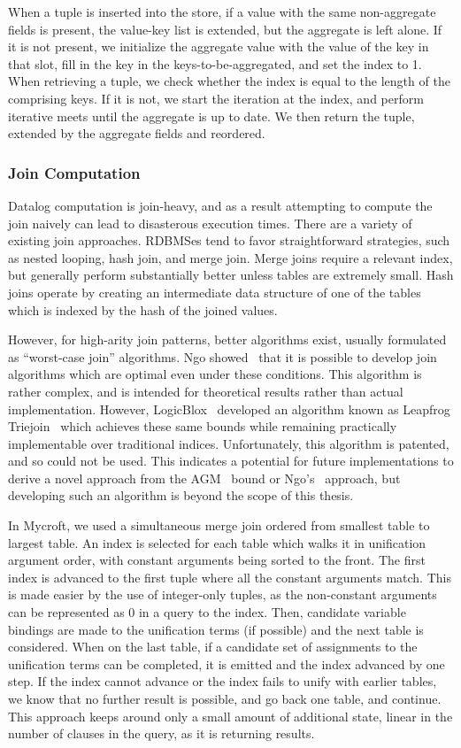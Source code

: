 When a tuple is inserted into the store, if a value with the same non-aggregate fields is present, the value-key list is extended, but the aggregate is left alone.
If it is not present, we initialize the aggregate value with the value of the key in that slot, fill in the key in the keys-to-be-aggregated, and set the index to 1.
When retrieving a tuple, we check whether the index is equal to the length of the comprising keys.
If it is not, we start the iteration at the index, and perform iterative meets until the aggregate is up to date.
We then return the tuple, extended by the aggregate fields and reordered.

\subsubsection{Join Computation}
Datalog computation is join-heavy, and as a result attempting to compute the join naively can lead to disasterous execution times.
There are a variety of existing join approaches.
RDBMSes tend to favor straightforward strategies, such as nested looping, hash join, and merge join.
Merge joins require a relevant index, but generally perform substantially better unless tables are extremely small.
Hash joins operate by creating an intermediate data structure of one of the tables which is indexed by the hash of the joined values.

However, for high-arity join patterns, better algorithms exist, usually formulated as ``worst-case join'' algorithms.
Ngo showed~\cite{nprr} that it is possible to develop join algorithms which are optimal even under these conditions.
This algorithm is rather complex, and is intended for theoretical results rather than actual implementation.
However, LogicBlox~\cite{logicblox} developed an algorithm known as Leapfrog Triejoin~\cite{lftj} which achieves these same bounds while remaining practically implementable over traditional indices.
Unfortunately, this algorithm is patented, and so could not be used.
This indicates a potential for future implementations to derive a novel approach from the AGM~\cite{agm} bound or Ngo's~\cite{nprr} approach, but developing such an algorithm is beyond the scope of this thesis.

In Mycroft, we used a simultaneous merge join ordered from smallest table to largest table.
An index is selected for each table which walks it in unification argument order, with constant arguments being sorted to the front.
The first index is advanced to the first tuple where all the constant arguments match.
This is made easier by the use of integer-only tuples, as the non-constant arguments can be represented as 0 in a query to the index.
Then, candidate variable bindings are made to the unification terms (if possible) and the next table is considered.
When on the last table, if a candidate set of assignments to the unification terms can be completed, it is emitted and the index advanced by one step.
If the index cannot advance or the index fails to unify with earlier tables, we know that no further result is possible, and go back one table, and continue.
This approach keeps around only a small amount of additional state, linear in the number of clauses in the query, as it is returning results.

